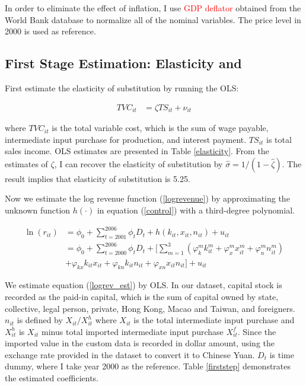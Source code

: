 \documentclass[11pt,letter]{article}
\newcommand{\prn}[1]{\left({#1}\right)}
\begin{document}
\begin{appendices}
In order to eliminate the effect of inflation, I use \textcolor{red}{GDP deflator} obtained from the World Bank database to normalize all of the nominal variables. The price level in 2000 is used as reference.


\subsection{First Stage Estimation: Elasticity and }

First estimate the elasticity of substitution by running the OLS:


\begin{align}
TVC_{it} &=\zeta TS_{it} + \nu_{it}
\end{align}

\noindent where $TVC_{it}$ is the total variable cost, which is the sum of wage payable, intermediate input purchase for production, and interest payment. $TS_{it}$ is total sales income. OLS estimates are presented in Table \ref{elasticity}. From the estimates of $\zeta$, I can recover the elasticity of substitution by $\hat{\sigma}=1/(1-\hat{\zeta})$. The result implies that elasticity of substitution is 5.25.



Now we estimate the log revenue function (\ref{logrevenue}) by approximating the unknown function $h(\cdot)$ in equation (\ref{control}) with a third-degree polynomial.

\begin{align}
\ln (r_{it})  &= \phi_0 + \sum_{t=2001}^{2006} \phi_t D_t +h(k_{it},x_{it},n_{it}) + u_{it} \nonumber \\
&=\phi_0 + \sum_{t=2000}^{2006} \phi_t D_t +\Bigg[  \sum_{m=1}^3 \prn{\varphi_k^m k_{it}^m + \varphi_x^m x_{it}^m + \varphi_n^m n_{it}^m } \nonumber \\
& + \varphi_{kx}k_{it}x_{it} +  \varphi_{kn}k_{it}n_{it} + \varphi_{xn} x_{it}n_{it}  \Bigg] + u_{it} \label{logrev_est}
\end{align}

\noindent  We estimate equation (\ref{logrev_est}) by OLS. In our dataset, capital stock is recorded as the paid-in capital, which is the sum of capital owned by state, collective, legal person, private, Hong Kong, Macao and Taiwan, and foreigners. $n_{it}$ is defined by $X_{it}/{X_{it}^h}$ where $X_{it}$ is the total intermediate input purchase and $X_{it}^h$ is $X_{it}$ minus total imported intermediate input purchase $X_{it}^f$. Since the imported value in the custom data is recorded in dollar amount, using the exchange rate provided in the dataset to convert it to Chinese Yuan. $D_t$ is time dummy, where I take year 2000 as the reference. Table \ref{firststep} demonstrates the estimated coefficients.


\end{appendices}
\end{document}
